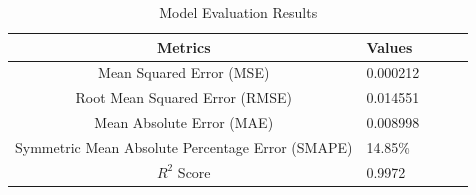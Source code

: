 
\begin{table}[h!]
\centering
\caption{Model Evaluation Results}
\label{table:evaluation_metrics}
\begin{tabularx}{\linewidth}{cXccc}
\hline
\textbf{Metrics} & \textbf{Values} \\ \hline
Mean Squared Error (MSE) & 0.000212 \\ \hline
Root Mean Squared Error (RMSE) & 0.014551 \\ \hline
Mean Absolute Error (MAE) & 0.008998 \\ \hline
Symmetric Mean Absolute Percentage Error (SMAPE) & 14.85\% \\ \hline
$R^{2}$ Score & 0.9972 \\ \hline
\end{tabularx}
\end{table}
